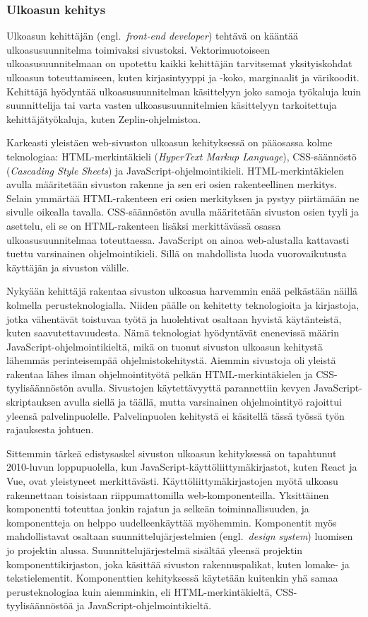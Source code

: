 \documentclass[finnish, 12pt, a4paper, elec, utf8, a-1b, online]{aaltothesis}
\begin{document}
\subsubsection{Ulkoasun kehitys}\label{background-web-development}

Ulkoasun kehittäjän (engl.~\textit{front-end developer}) tehtävä on kääntää
ulkoasusuunnitelma toimivaksi sivustoksi. Vektorimuotoiseen ulkoasusuunnitelmaan
on upotettu kaikki kehittäjän tarvitsemat yksityiskohdat ulkoasun
toteuttamiseen, kuten kirjasintyyppi ja -koko, marginaalit ja värikoodit.
Kehittäjä hyödyntää ulkoasusuunnitelman käsittelyyn joko samoja työkaluja kuin
suunnittelija tai varta vasten ulkoasusuunnitelmien käsittelyyn tarkoitettuja
kehittäjätyökaluja, kuten Zeplin-ohjelmistoa.

Karkeasti yleistäen web-sivuston ulkoasun kehityksessä on pääosassa kolme
teknologiaa: HTML-merkintäkieli (\textit{HyperText Markup Language}),
CSS-säännöstö (\textit{Cascading Style Sheets}) ja JavaScript-ohjelmointikieli.
HTML-merkintäkielen avulla määritetään sivuston rakenne ja sen eri osien
rakenteellinen merkitys. Selain ymmärtää HTML-rakenteen eri osien merkityksen ja
pystyy piirtämään ne sivulle oikealla tavalla. CSS-säännöstön avulla määritetään
sivuston osien tyyli ja asettelu, eli se on HTML-rakenteen lisäksi merkittävässä
osassa ulkoasusuunnitelmaa toteuttaessa. JavaScript on ainoa web-alustalla
kattavasti tuettu varsinainen ohjelmointikieli. Sillä on mahdollista luoda
vuorovaikutusta käyttäjän ja sivuston välille.

Nykyään kehittäjä rakentaa sivuston ulkoasua harvemmin enää pelkästään näillä
kolmella perusteknologialla. Niiden päälle on kehitetty teknologioita ja
kirjastoja, jotka vähentävät toistuvaa työtä ja huolehtivat osaltaan hyvistä
käytänteistä, kuten saavutettavuudesta. Nämä teknologiat hyödyntävät enenevissä
määrin JavaScript-ohjelmointikieltä, mikä on tuonut sivuston ulkoasun kehitystä
lähemmäs perinteisempää ohjelmistokehitystä. Aiemmin sivustoja oli yleistä
rakentaa lähes ilman ohjelmointityötä pelkän HTML-merkintäkielen ja
CSS-tyylisäännöstön avulla. Sivustojen käytettävyyttä parannettiin kevyen
JavaScript-skriptauksen avulla siellä ja täällä, mutta varsinainen
ohjelmointityö rajoittui yleensä palvelinpuolelle. Palvelinpuolen kehitystä ei
käsitellä tässä työssä työn rajauksesta johtuen.

Sittemmin tärkeä edistysaskel sivuston ulkoasun kehityksessä on tapahtunut
2010-luvun loppupuolella, kun JavaScript-käyttöliittymäkirjastot, kuten React ja
Vue, ovat yleistyneet merkittävästi. Käyttöliittymäkirjastojen myötä ulkoasu
rakennettaan toisistaan riippumattomilla web-komponenteilla. Yksittäinen
komponentti toteuttaa jonkin rajatun ja selkeän toiminnallisuuden, ja
komponentteja on helppo uudelleenkäyttää myöhemmin. Komponentit myös
mahdollistavat osaltaan suunnittelujärjestelmien (engl.~\textit{design system})
luomisen jo projektin alussa. Suunnittelujärjestelmä sisältää yleensä projektin
komponenttikirjaston, joka käsittää sivuston rakennuspalikat, kuten lomake- ja
tekstielementit. Komponenttien kehityksessä käytetään kuitenkin yhä samaa
perusteknologiaa kuin aiemminkin, eli HTML-merkintäkieltä, CSS-tyylisäännöstöä
ja JavaScript-ohjelmointikieltä.
\end{document}
